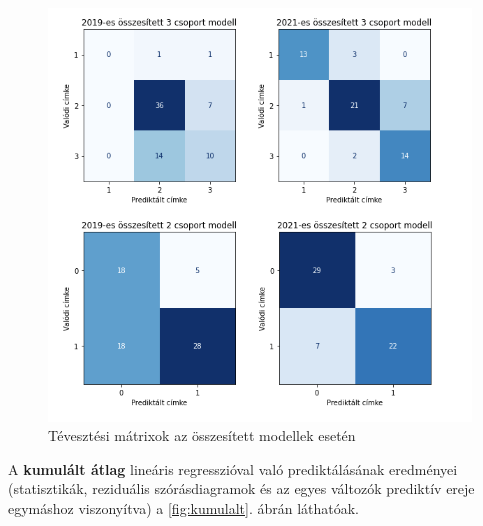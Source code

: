 \documentclass[12pt]{article}
\begin{document}
\begin{figure}[H]
\centering
\includegraphics[width=.8\textwidth]{kepek/confusion_matrices.png}
\caption{Tévesztési mátrixok az összesített modellek esetén}
\label{fig:confusion}
\end{figure}

\newpage

A \textbf{kumulált átlag} lineáris regresszióval való prediktálásának eredményei (statisztikák, reziduális szórásdiagramok és az egyes változók prediktív ereje egymáshoz viszonyítva) a \ref{fig:kumulalt}. ábrán láthatóak. 

\vspace{0.5cm}
\end{document}
